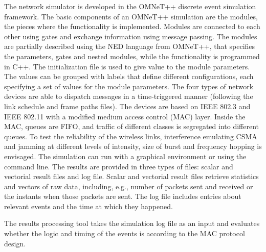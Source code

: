 \documentclass[conference]{IEEEtran}
\begin{document}
The network simulator is developed in the OMNeT++ discrete event simulation framework. The basic components of an OMNeT++ simulation are the modules, the pieces where the functionality is implemented. Modules are connected to each other using gates and exchange information using message passing. The modules are partially described using the NED language from OMNeT++, that specifies the parameters, gates and nested modules, while the functionality is programmed in C++. The initialization file is used to give value to the module parameters. The values can be grouped with labels that define different configurations, each specifying a set of values for the module parameters. The four types of network devices are able to dispatch messages in a time-triggered manner (following the link schedule and frame paths files). The devices are based on IEEE 802.3 and IEEE 802.11 with a modified medium access control (MAC) layer. Inside the MAC, queues are FIFO, and traffic of different classes is segregated into different queues. To test the reliability of the wireless links, interference emulating CSMA and jamming at different levels of intensity, size of burst and frequency hopping is envisaged. The simulation can run with a graphical environment or using the command line. The results are provided in three types of files: scalar and vectorial result files and log file. Scalar and vectorial result files retrieve statistics and vectors of raw data, including, e.g., number of packets sent and received or the instants when those packets are sent. The log file includes entries about relevant events and the time at which they happened.

The results processing tool takes the simulation log file as an input and evaluates whether the logic and timing of the events is according to the MAC protocol design.



\end{document}
